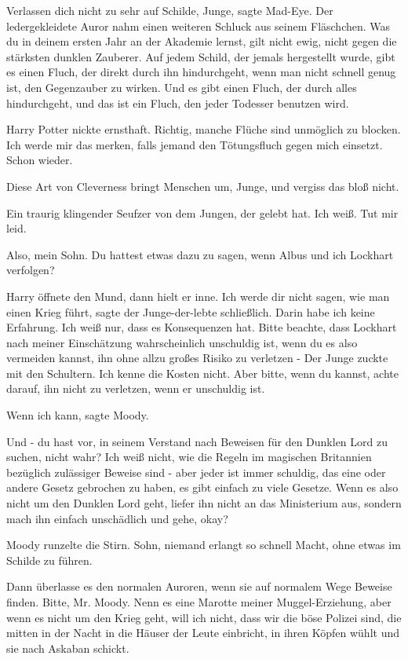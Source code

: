 \glqq Verlassen dich nicht zu sehr auf Schilde, Junge\grqq{}, sagte Mad-Eye. Der
ledergekleidete Auror nahm einen weiteren Schluck aus seinem Fläschchen. \glqq
Was du in deinem ersten Jahr an der Akademie lernst, gilt nicht ewig, nicht
gegen die stärksten dunklen Zauberer. Auf jedem Schild, der jemals hergestellt
wurde, gibt es einen Fluch, der direkt durch ihn hindurchgeht, wenn man nicht
schnell genug ist, den Gegenzauber zu wirken. Und es gibt einen Fluch, der durch
alles hindurchgeht, und das ist ein Fluch, den jeder Todesser benutzen
wird.\grqq{}

Harry Potter nickte ernsthaft. \glqq Richtig, manche Flüche sind unmöglich zu
blocken. Ich werde mir das merken, falls jemand den Tötungsfluch gegen mich
einsetzt. Schon wieder.\grqq{}

\glqq Diese Art von Cleverness bringt Menschen um, Junge, und vergiss das bloß
nicht.\grqq{}

Ein traurig klingender Seufzer von dem Jungen, der gelebt hat. \glqq Ich weiß.
Tut mir leid.\grqq{}

\glqq Also, mein Sohn. Du hattest etwas dazu zu sagen, wenn Albus und ich
Lockhart verfolgen?\grqq{}

Harry öffnete den Mund, dann hielt er inne. \glqq Ich werde dir nicht sagen, wie
man einen Krieg führt\grqq{}, sagte der Junge-der-lebte schließlich. \glqq Darin
habe ich keine Erfahrung. Ich weiß nur, dass es Konsequenzen hat. Bitte beachte,
dass Lockhart nach meiner Einschätzung wahrscheinlich unschuldig ist, wenn du es
also vermeiden kannst, ihn ohne allzu großes Risiko zu verletzen -\grqq{} Der
Junge zuckte mit den Schultern. \glqq Ich kenne die Kosten nicht. Aber bitte,
wenn du kannst, achte darauf, ihn nicht zu verletzen, wenn er unschuldig
ist.\grqq{}

\glqq Wenn ich kann\grqq{}, sagte Moody.

\glqq Und - du hast vor, in seinem Verstand nach Beweisen für den Dunklen Lord
zu suchen, nicht wahr? Ich weiß nicht, wie die Regeln im magischen Britannien
bezüglich zulässiger Beweise sind - aber jeder ist immer schuldig, das eine oder
andere Gesetz gebrochen zu haben, es gibt einfach zu viele Gesetze. Wenn es also
nicht um den Dunklen Lord geht, liefer ihn nicht an das Ministerium aus, sondern
mach ihn einfach unschädlich und gehe, okay?\grqq{}

Moody runzelte die Stirn. \glqq Sohn, niemand erlangt so schnell Macht, ohne
etwas im Schilde zu führen.\grqq{}

\glqq Dann überlasse es den normalen Auroren, wenn sie auf normalem Wege Beweise
finden. Bitte, Mr. Moody. Nenn es eine Marotte meiner Muggel-Erziehung, aber
wenn es nicht um den Krieg geht, will ich nicht, dass wir die böse Polizei sind,
die mitten in der Nacht in die Häuser der Leute einbricht, in ihren Köpfen wühlt
und sie nach Askaban schickt.\grqq{}

